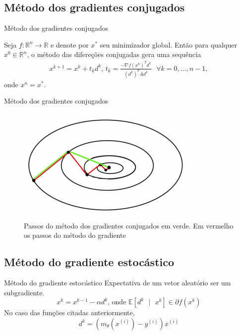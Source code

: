 \documentclass{beamer}
\begin{document}
    \subsection{Método dos gradientes conjugados}
        \begin{frame}{Método dos gradientes conjugados}
            \begin{theorem}
                Seja $f: \mathbb{R}^n \to \mathbb{R}$ e denote por $x^{*}$ seu minimizador global. Então para qualquer $x^0 \in \mathbb{R}^n$, o método das difereções conjugadas gera uma sequência
                \begin{gather*}
                x^{k+1} = x^{k} + t_{k}d^{k} \mbox{, } t_k = \frac{-\nabla f(x^k)^{T}d^k}{(d^k)^{T}Ad^k}\mbox{   } \forall k = 0,...,n-1 ,
                \end{gather*}
                onde $x^n = x^{*}$.
            \end{theorem}
        \end{frame}
        
        \begin{frame}{Método dos gradientes conjugados}
            \begin{figure}
                \centering
                \includegraphics[width=.8\textwidth]{gradienteconj.png}
                \caption{Passos do método dos gradientes conjugados em verde. Em vermelho os passos do método do gradiente}
                \label{fig:my_label}
            \end{figure}    
        \end{frame}
        
    \subsection{Método do gradiente estocástico}
        \begin{frame}{Método do gradiente estocástico}
            Expectativa de um vetor aleatório ser um subgradiente.
            \begin{equation*}
                x^k = x^{k-1} - \alpha d^k\text{, onde }\mathbb{E}[d^k\mbox{ }\vert\mbox{ } x^k] \in \partial f(x^k)
            \end{equation*}
            No caso das funções citadas anteriormente,
            \begin{equation*}
                d^{k} = (m_\theta(x^{(i)}) - y^{(i)})x^{(i)}
            \end{equation*}
        \end{frame}
\end{document}
